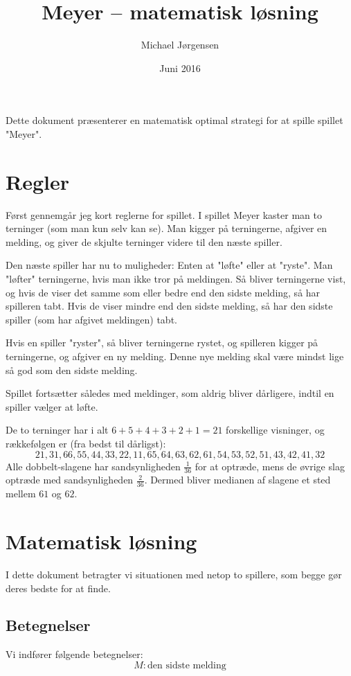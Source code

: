 \documentclass[12pt,oneside,a4paper]{article}
\title{Meyer -- matematisk løsning}
\date{Juni 2016}
\author{Michael Jørgensen}
\newcommand{\be}{\begin{equation}}
\newcommand{\ee}{\end{equation}}
\begin{document}
\maketitle

Dette dokument præsenterer en matematisk optimal strategi for at spille spillet
"Meyer".

\section{Regler}

Først gennemgår jeg kort reglerne for spillet.  I spillet Meyer kaster man to
terninger (som man kun selv kan se).  Man kigger på terningerne, afgiver en
melding, og giver de skjulte terninger videre til den næste spiller.

Den næste spiller har nu to muligheder: Enten at "løfte" eller at "ryste". Man
"løfter" terningerne, hvis man ikke tror på meldingen. Så bliver terningerne
vist, og hvis de viser det samme som eller bedre end den sidste melding, så har
spilleren tabt. Hvis de viser mindre end den sidste melding, så har den sidste
spiller (som har afgivet meldingen) tabt.

Hvis en spiller "ryster", så bliver terningerne rystet, og spilleren kigger på
terningerne, og afgiver en ny melding. Denne nye melding skal være mindst lige
så god som den sidste melding.

Spillet fortsætter således med meldinger, som aldrig bliver dårligere, indtil en spiller vælger at løfte.

De to terninger har i alt $6+5+4+3+2+1=21$ forskellige visninger, og
rækkefølgen er (fra bedst til dårligst):
\be
21, 31,
66, 55, 44, 33, 22, 11,
65, 64, 63, 62, 61,
54, 53, 52, 51,
43, 42, 41,
32
\label{udfaldsrum}
\ee Alle dobbelt-slagene har sandsynligheden $\frac{1}{36}$ for at optræde,
mens de øvrige slag optræde med sandsynligheden $\frac{2}{36}$. Dermed bliver
medianen af slagene et sted mellem $61$ og $62$.

\section{Matematisk løsning}
I dette dokument betragter vi situationen med netop to spillere, som begge
gør deres bedste for at finde.

\subsection{Betegnelser}
Vi indfører følgende betegnelser:
$$
M : \mbox{den sidste melding}
$$
\end{document}
